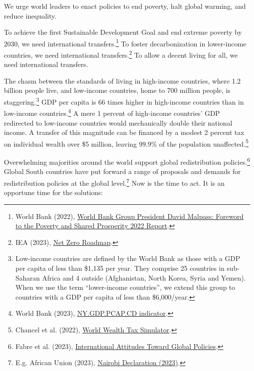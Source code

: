 \documentclass[a5paper,english,openany]{memoir}
\begin{document}
We urge world leaders to enact policies to end poverty, halt global warming, and reduce inequality. 

To achieve the first Sustainable Development Goal and end extreme poverty by 2030, we need international transfers.\footnote{World Bank (2022), \href{https://www.worldbank.org/en/news/statement/2022/10/05/world-bank-group-president-david-malpass-foreword-to-the-poverty-and-shared-prosperity-report}{World Bank Group President David Malpass: Foreword to the Poverty and Shared Prosperity 2022 Report}.} 
To foster decarbonization in lower-income countries, we need international transfers.\footnote{IEA (2023), \href{https://www.iea.org/reports/net-zero-roadmap-a-global-pathway-to-keep-the-15-0c-goal-in-reach/}{Net Zero Roadmap}.} 
To allow a decent living for all, we need international transfers.

The chasm between the standards of living in high-income countries, where 1.2 billion people live, and low-income countries, home to 700 million people, is staggering.\footnote{Low-income countries are defined by the World Bank as those with a GDP per capita of less than \$1,135 per year. They comprise 25 countries in sub-Saharan Africa and 4 outside (Afghanistan, North Korea, Syria and Yemen). When we use the term ``lower-income countries'', we extend this group to countries with a GDP per capita of less than \$6,000/year.} %
GDP per capita is 66 times higher in high-income countries than in low-income countries.\footnote{World Bank (2023), \href{https://data.worldbank.org/indicator/NY.GDP.PCAP.CD?end=2022\&locations=EU-ZG-XD-XM-1W-IN-US-CD-BI-LU-CN\&start=2022\&view=bar}{NY.GDP.PCAP.CD indicator}.} 
A mere 1 percent of high-income countries' GDP redirected to low-income countries would mechanically double their national income. A transfer of this magnitude can be financed by a modest 2 percent tax on individual wealth over \$5 million, leaving 99.9\% of the population unaffected.\footnote{Chancel et al. (2022), \href{https://wid.world/world-wealth-tax-simulator/}{World Wealth Tax Simulator}.}%

Overwhelming majorities around the world support global redistribution policies.\footnote{Fabre et al. (2023), \href{https://papers.ssrn.com/sol3/papers.cfm?abstract\_id=4448523}{International Attitudes Toward Global Policies}.} 
Global South countries have put forward a range of proposals and demands for redistribution policies at the global level.\footnote{E.g. African Union (2023), \href{https://media.africaclimatesummit.org/NAIROBI+Declaration+FURTHER+edited+060923+EN+920AM.pdf}{Nairobi Declaration (2023)}.} Now is the time to act. It is an opportune time for the solutions: %
\end{document}
